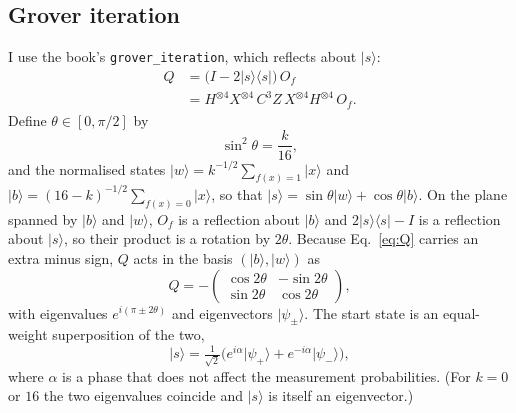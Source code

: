 \documentclass[10pt,twocolumn,a4paper]{article}
\newcommand{\ket}[1]{\lvert #1\rangle}
\newcommand{\bra}[1]{\langle #1\rvert}
\newcommand{\proj}[1]{\ket{#1}\!\bra{#1}}
\begin{document}
\subsection{Grover iteration}
I use the book's \texttt{grover\_iteration}, which reflects about $\ket{s}$:
\begin{equation}
\begin{split}
Q&=\bigl(I-2\proj{s}\bigr)\,O_f\\
 &=H^{\otimes4}X^{\otimes4}\,C^{3}Z\,X^{\otimes4}H^{\otimes4}\,O_f .
\end{split}
\label{eq:Q}
\end{equation}
Define $\theta\in[0,\pi/2]$ by
\begin{equation}
\sin^2\theta=\frac{k}{16},
\end{equation}
and the normalised states
$\ket{w}=k^{-1/2}\sum_{f(x)=1}\ket{x}$ and
$\ket{b}=(16-k)^{-1/2}\sum_{f(x)=0}\ket{x}$, so that
$\ket{s}=\sin\theta\ket{w}+\cos\theta\ket{b}$.
On the plane spanned by $\ket{b}$ and $\ket{w}$, $O_f$ is a reflection
about $\ket{b}$ and $2\proj{s}-I$ is a reflection about $\ket{s}$, so their
product is a rotation by $2\theta$. Because Eq.~\eqref{eq:Q} carries an
extra minus sign, $Q$ acts in the basis $(\ket{b},\ket{w})$ as
\begin{equation}
Q=-\begin{pmatrix}\cos2\theta&-\sin2\theta\\ \sin2\theta&\cos2\theta\end{pmatrix},
\end{equation}
with eigenvalues $e^{i(\pi\pm2\theta)}$ and eigenvectors $\ket{\psi_\pm}$.
The start state is an equal-weight superposition of the two,
\begin{equation}
\ket{s}=\tfrac{1}{\sqrt2}\bigl(e^{i\alpha}\ket{\psi_+}+e^{-i\alpha}\ket{\psi_-}\bigr),
\label{eq:split}
\end{equation}
where $\alpha$ is a phase that does not affect the measurement
probabilities. (For $k=0$ or $16$ the two eigenvalues coincide and $\ket{s}$
is itself an eigenvector.)
\end{document}
